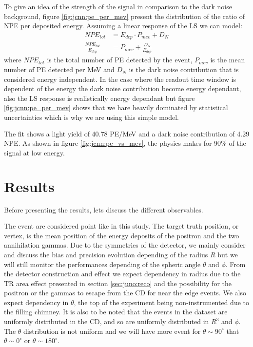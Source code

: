 \documentclass[../main.tex]{subfiles}
\begin{document}
To give an idea of the strength of the signal in comparison to the dark noise background, figure \ref{fig:jcnn:pe_per_mev} present the distribution of the ratio of NPE per deposited energy. Assuming a linear response of the LS we can model:
\begin{align}
  NPE_{tot} &= E_{dep} \cdot P_{mev} + D_{N} \\
  \frac{NPE_{tot}}{E_{dep}} &= P_{mev} + \frac{D_{N}}{E_{dep}} \label{eq:jcnn:pe_per_mev}
\end{align}
where $NPE_{tot}$ is the total number of PE detected by the event, $P_{mev}$ is the mean number of PE detected per MeV and $D_{N}$ is the dark noise contribution that is considered energy independent. In the case where the readout time window is dependent of the energy the dark noise contribution become energy dependant, also the LS response is realistically energy dependant but figure \ref{fig:jcnn:pe_per_mev} shows that we hare heavily dominated by statistical uncertainties which is why we are using this simple model.

The fit shows a light yield of 40.78 PE/MeV and a dark noise contribution of 4.29 NPE. As shown in figure \ref{fig:jcnn:pe_vs_mev}, the physics makes for 90\% of the signal at low energy.


\section{Results}

Before presenting the results, lets discuss the different observables.

The event are considered point like in this study. The target truth position, or vertex, is the mean position of the energy deposits of the positron and the two annihilation gammas. Due to the symmetries of the detector, we mainly consider and discuss the bias and precision evolution depending of the radius $R$ but we will still monitor the performances depending of the spheric angle $\theta$ and $\phi$. From the detector construction and effect we expect dependency in radius due to the TR area effect presented in section \ref{sec:juno:reco} and the possibility for the positron or the gammas to escape from the CD for near the edge events. We  also expect dependency in $\theta$, the top of the experiment being non-instrumented due to the filling chimney. It is also to be noted that the events in the dataset are uniformly distributed in the CD, and so are uniformly distributed in $R^3$ and $\phi$. The $\theta$ distribution is not uniform and we will have more event for $\theta \sim 90^{\circ}$ that $\theta \sim 0^{\circ}$ or $\theta \sim 180^{\circ}$.
\end{document}

